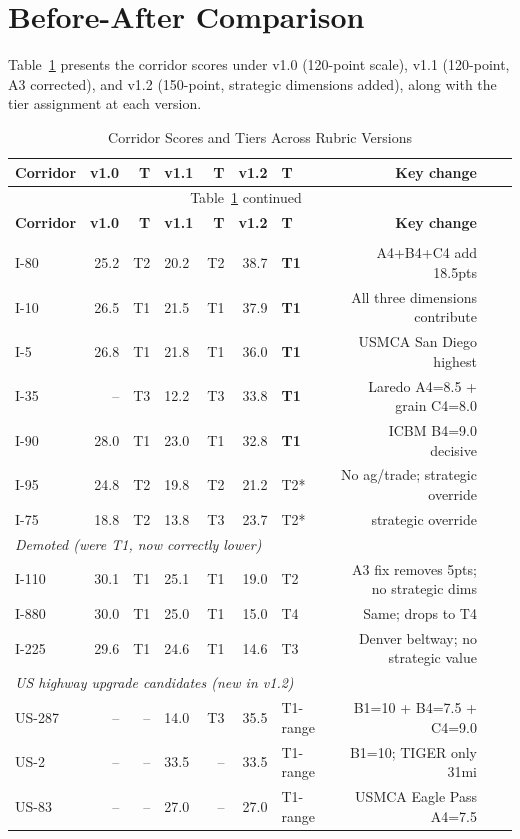\section{Before-After Comparison}

Table~\ref{tab:before-after} presents the corridor scores under v1.0 (120-point scale), v1.1 (120-point, A3 corrected), and v1.2 (150-point, strategic dimensions added), along with the tier assignment at each version.

\begin{longtable}{lrrlrrlrrl}
\caption{Corridor Scores and Tiers Across Rubric Versions} \label{tab:before-after} \\
\toprule
\textbf{Corridor} & \textbf{v1.0} & \textbf{T} & \textbf{v1.1} & \textbf{T} & \textbf{v1.2} & \textbf{T} & \textbf{Key change} \\
\midrule
\endfirsthead
\multicolumn{8}{c}{Table~\ref{tab:before-after} continued} \\
\toprule
\textbf{Corridor} & \textbf{v1.0} & \textbf{T} & \textbf{v1.1} & \textbf{T} & \textbf{v1.2} & \textbf{T} & \textbf{Key change} \\
\midrule
\endhead
\bottomrule
\endfoot

\multicolumn{8}{l}{\textit{Corrected T1 arteries (gained from v1.0)}} \\
I-80 & 25.2 & T2 & 20.2 & T2 & 38.7 & \textbf{T1} & A4+B4+C4 add 18.5pts \\
I-10 & 26.5 & T1 & 21.5 & T1 & 37.9 & \textbf{T1} & All three dimensions contribute \\
I-5  & 26.8 & T1 & 21.8 & T1 & 36.0 & \textbf{T1} & USMCA San Diego highest \\
I-35 & -- & T3 & 12.2 & T3 & 33.8 & \textbf{T1} & Laredo A4=8.5 + grain C4=8.0 \\
I-90 & 28.0 & T1 & 23.0 & T1 & 32.8 & \textbf{T1} & ICBM B4=9.0 decisive \\
I-95 & 24.8 & T2 & 19.8 & T2 & 21.2 & T2* & No ag/trade; strategic override \\
I-75 & 18.8 & T2 & 13.8 & T3 & 23.7 & T2* & strategic override \\
\midrule
\multicolumn{8}{l}{\textit{Demoted (were T1, now correctly lower)}} \\
I-110 & 30.1 & T1 & 25.1 & T1 & 19.0 & T2 & A3 fix removes 5pts; no strategic dims \\
I-880 & 30.0 & T1 & 25.0 & T1 & 15.0 & T4 & Same; drops to T4 \\
I-225 & 29.6 & T1 & 24.6 & T1 & 14.6 & T3 & Denver beltway; no strategic value \\
\midrule
\multicolumn{8}{l}{\textit{US highway upgrade candidates (new in v1.2)}} \\
US-287 & -- & -- & 14.0 & T3 & 35.5 & T1-range & B1=10 + B4=7.5 + C4=9.0 \\
US-2   & -- & -- & 33.5 & -- & 33.5 & T1-range & B1=10; TIGER only 31mi \\
US-83  & -- & -- & 27.0 & -- & 27.0 & T1-range & USMCA Eagle Pass A4=7.5 \\
\end{longtable}

